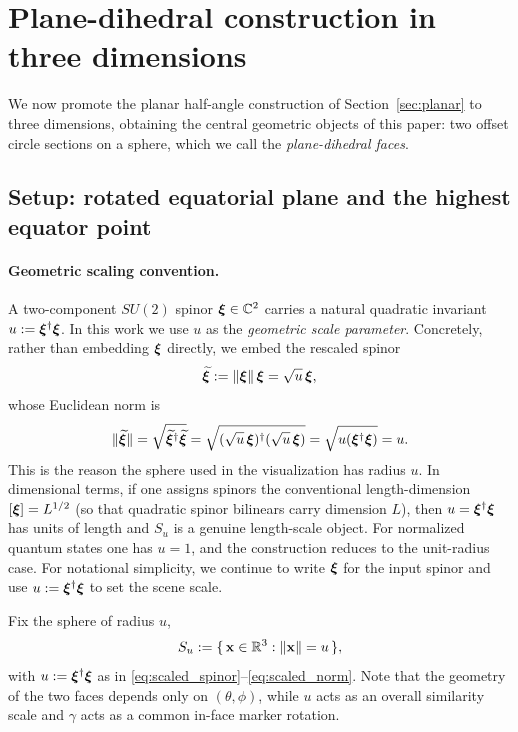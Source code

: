 \section{\label{sec:hyperchords} Plane-dihedral construction in three dimensions}

We now promote the planar half-angle construction of Section~\ref{sec:planar} to three dimensions,
obtaining the central geometric objects of this paper: two offset circle sections on a sphere,
which we call the \emph{plane-dihedral faces}.

\subsection{Setup: rotated equatorial plane and the highest equator point}
\label{sec:hyperchords_setup}
\paragraph{Geometric scaling convention.}
A two-component $SU(2)$ spinor $\bm{\xi}\in\mathbb{C}^2$ carries a natural quadratic invariant
$u:=\bm{\xi}^\dagger\bm{\xi}$.
In this work we use $u$ as the \emph{geometric scale parameter}.
Concretely, rather than embedding $\bm{\xi}$ directly, we embed the rescaled spinor
\begin{equation}
\label{eq:scaled_spinor}
\widetilde{\bm{\xi}} := \|\bm{\xi}\|\,\bm{\xi} = \sqrt{u}\,\bm{\xi},
\end{equation}
whose Euclidean norm is
\begin{equation}
\label{eq:scaled_norm}
\|\widetilde{\bm{\xi}}\| = \sqrt{\widetilde{\bm{\xi}}^\dagger\widetilde{\bm{\xi}}}
= \sqrt{(\sqrt{u}\,\bm{\xi})^\dagger(\sqrt{u}\,\bm{\xi})} = \sqrt{u(\bm{\xi}^\dagger\bm{\xi})} = u.
\end{equation}
This is the reason the sphere used in the visualization has radius $u$.
In dimensional terms, if one assigns spinors the conventional length-dimension $[\bm{\xi}]=L^{1/2}$ (so that quadratic spinor bilinears carry dimension $L$), then $u=\bm{\xi}^\dagger\bm{\xi}$ has units of length and $S_u$ is a genuine length-scale object.
For normalized quantum states one has $u=1$, and the construction reduces to the unit-radius case.
For notational simplicity, we continue to write $\bm{\xi}$ for the input spinor and use $u:=\bm{\xi}^\dagger\bm{\xi}$ to set the scene scale.

Fix the sphere of radius $u$,
\[
S_u := \{\,\mathbf{x}\in\mathbb{R}^3 : \lVert\mathbf{x}\rVert=u\,\},
\]
with $u:=\bm{\xi}^\dagger\bm{\xi}$ as in \eqref{eq:scaled_spinor}--\eqref{eq:scaled_norm}. Note that the geometry of the two faces depends only on $(\theta,\phi)$, while $u$ acts as an overall similarity scale and $\gamma$ acts as a common in-face marker rotation.


